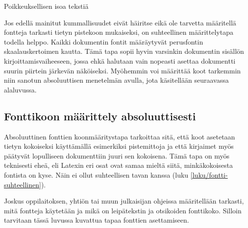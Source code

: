 \begin{koodilohkosis}
{ Poikkeuksellisen isoa tekstiä}
\end{koodilohkosis}

\noindent
Jos edellä mainitut kummallisuudet eivät häiritse eikä ole tarvetta
määritellä fontteja tarkasti tietyn pistekoon mukaiseksi, on
suhteellinen määrittelytapa todella helppo. Kaikki dokumentin fontit
määräytyvät perusfontin skaalauskertoimen kautta. Tämä tapa sopii hyvin
varsinkin dokumentin sisällön kirjoittamisvaiheeseen, jossa ehkä
halutaan vain nopeasti asettaa dokumentti suurin piirtein järkevän
näköiseksi. Myöhemmin voi määrittää koot tarkemmin niin sanotun
absoluuttisen menetelmän avulla, jota käsitellään seuraavassa
alaluvussa.

\subsection{Fonttikoon määrittely absoluuttisesti}
\label{luku/fontti-absoluuttinen}

Absoluuttinen fonttien koonmääritystapa tarkoittaa sitä, että koot
asetetaan tietyn kokoiseksi käyttämällä esimerkiksi pistemittoja ja että
kirjaimet myös päätyvät lopulliseen dokumenttiin juuri sen kokoisena.
Tämä tapa on myös teknisesti eheä, eli Latexin eri osat ovat samaa
mieltä siitä, minkäkokoisesta fontista on kyse. Näin ei ollut
suhteellisen tavan kanssa (luku \ref{luku/fontti-suhteellinen}).

Joskus oppilaitoksen, yhtiön tai muun julkaisijan ohjeissa määritellään
tarkasti, mitä fontteja käytetään ja mikä on leipätekstin ja otsikoiden
fonttikoko. Silloin tarvitaan tässä luvussa kuvattua tapaa fonttien
asettamiseen.

